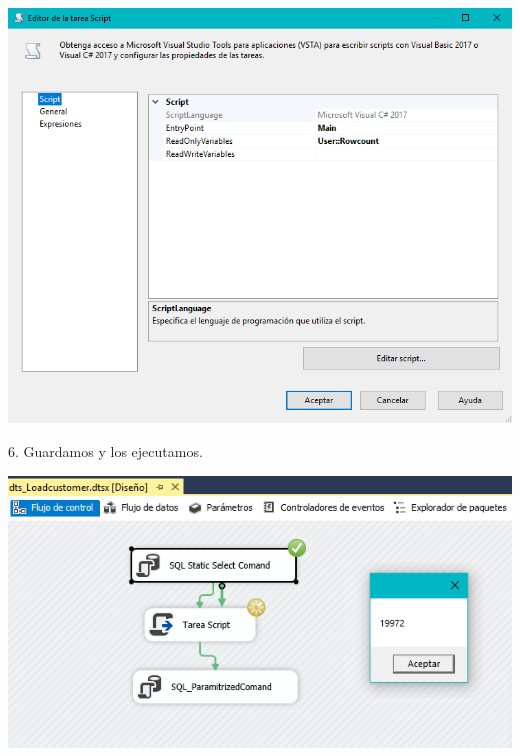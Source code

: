 	\begin{center}
	\includegraphics[width=\columnwidth]{images/task2/img26}
    \end{center}	

6. Guardamos y los ejecutamos.
    \begin{center}
	\includegraphics[width=\columnwidth]{images/task2/img27}
	\end{center}	